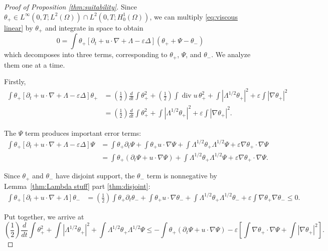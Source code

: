 \documentclass[11pt]{amsart}
\theoremstyle{remark}
\theoremstyle{definition}
\newcommand{\eps}{\varepsilon}
\newcommand{\paren}[1]{\left( #1 \right)}
\newcommand{\bracket}[1]{\left[ #1 \right]}
\newcommand{\abs}[1]{\left\lvert #1 \right\rvert}
\newcommand{\del}{\partial}
\newcommand{\grad}{\nabla}
\newcommand{\ddt}{\frac{d}{dt}}
\renewcommand{\div}{\operatorname{div}}
\newcommand{\Laplace}{\Delta}
\begin{document}
\begin{proof}[Proof of Proposition \ref{thm:suitability}]
Since $\theta_+ \in L^\infty(0,T; L^2(\Omega)) \cap L^2(0,T; H_0^1(\Omega))$, we can multiply \eqref{eq:viscous linear} by $\theta_+$ and integrate in space to obtain
\[ 0 = \int \theta_+ \bracket{ \del_t + u \cdot \grad + \Lambda - \eps \Laplace} \paren{\theta_+ + \Psi - \theta_-} \]
which decomposes into three terms, corresponding to $\theta_+$, $\Psi$, and $\theta_-$.  We analyze them one at a time.  

Firstly,
\begin{align*} 
\int \theta_+ \bracket{ \del_t + u \cdot \grad + \Lambda -\eps\Laplace} \theta_+ &= \paren{\frac{1}{2}} \ddt \int \theta_+^2 + \paren{\frac{1}{2}} \int \div u \, \theta_+^2 + \int \abs{\Lambda^{1/2} \theta_+}^2 + \eps \int \abs{\grad\theta_+}^2
\\ &= \paren{\frac{1}{2}} \ddt \int \theta_+^2 + \int \abs{\Lambda^{1/2} \theta_+}^2 + \eps \int \abs{\grad\theta_+}^2.
\end{align*}

The $\Psi$ term produces important error terms:
\begin{align*} 
\int \theta_+ \bracket{ \del_t + u \cdot \grad + \Lambda -\eps\Laplace} \Psi &= \int \theta_+ \del_t \Psi + \int \theta_+ u \cdot \grad \Psi + \int \Lambda^{1/2} \theta_+ \Lambda^{1/2} \Psi + \eps \grad\theta_+ \cdot \grad\Psi
\\ &= \int \theta_+ (\del_t \Psi + u \cdot \grad \Psi) + \int \Lambda^{1/2} \theta_+ \Lambda^{1/2} \Psi + \eps \grad\theta_+ \cdot \grad\Psi.
\end{align*}

Since $\theta_+$ and $\theta_-$ have disjoint support, the $\theta_-$ term is nonnegative by Lemma~\ref{thm:Lambda stuff} part \eqref{thm:disjoint}:
\begin{align*} 
\int \theta_+ \bracket{ \del_t + u \cdot \grad + \Lambda } \theta_- &= \paren{\frac{1}{2}} \int \theta_+ \del_t \theta_- + \int \theta_+ u \cdot \grad \theta_- + \int \Lambda^{1/2} \theta_+ \Lambda^{1/2} \theta_- + \eps\int \grad\theta_+ \grad\theta_-
\leq 0.
\end{align*}

Put together, we arrive at 
\begin{equation} \label{first form of cacciopolli} \paren{\frac{1}{2}} \ddt \int \theta_+^2 + \int \abs{\Lambda^{1/2} \theta_+}^2 + \int \Lambda^{1/2} \theta_+ \Lambda^{1/2} \Psi \leq -\int \theta_+ (\del_t \Psi + u \cdot \grad \Psi) - \eps \bracket{\int \grad\theta_+ \cdot \grad\Psi + \int \abs{\grad\theta_+}^2}. \end{equation}


\end{proof}
\end{document}
